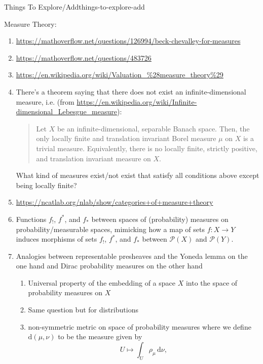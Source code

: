 \begin{remark}{Things To Explore/Add}{things-to-explore-add}
\begin{enumerate}
\begin{enumerate}
            \end{enumerate}
    \end{enumerate}
    Measure Theory:
    \begin{enumerate}
        \item \url{https://mathoverflow.net/questions/126994/beck-chevalley-for-measures}
        \item \url{https://mathoverflow.net/questions/483726}
        \item \url{https://en.wikipedia.org/wiki/Valuation_\%28measure_theory\%29}
        \item There's a theorem saying that there does not exist an infinite-dimensional  measure, i.e. (from \url{https://en.wikipedia.org/wiki/Infinite-dimensional_Lebesgue_measure}):
            \begin{quote}
                Let $X$ be an infinite-dimensional, separable Banach space. Then, the only locally finite and translation invariant Borel measure $\mu$ on $X$ is a trivial measure. Equivalently, there is no locally finite, strictly positive, and translation invariant measure on $X$.
            \end{quote}
            What kind of measures exist/not exist that satisfy all conditions above except being locally finite?
        \item \url{https://ncatlab.org/nlab/show/categories+of+measure+theory}
        \item Functions $f_{!}$, $f^{*}$, and $f_{*}$ between spaces of (probability) measures on probability/measurable spaces, mimicking how a map of sets $f\colon X\to Y$ induces morphisms of sets $f_{!}$, $f^{*}$, and $f_{*}$ between $\mathcal{P}(X)$ and $\mathcal{P}(Y)$.
        \item Analogies between representable presheaves and the Yoneda lemma on the one hand and Dirac probability measures on the other hand
            \begin{enumerate}
                \item Universal property of the embedding of a space $X$ into the space of probability measures on $X$
                \item Same question but for distributions
                \item non-symmetric metric on space of probability measures where we define $\mathrm{d}(\mu,\nu)$ to be the measure given by
                    \[
                        U%
                        \mapsto%
                        \int_{U}\rho_{\mu}\,\mathrm{d}\nu,%
\]
\end{enumerate}
\end{enumerate}
\end{remark}
